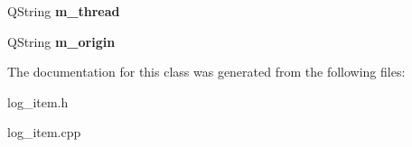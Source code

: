 \begin{DoxyCompactItemize}
\item 
\hypertarget{class_log__viewer_1_1_log__item_af97cbe89d09438bf284b5ba48f64a810}{Q\-String {\bfseries m\-\_\-thread}}\label{class_log__viewer_1_1_log__item_af97cbe89d09438bf284b5ba48f64a810}

\item 
\hypertarget{class_log__viewer_1_1_log__item_a3e27163b918b9ac0dac0ce30e2f12a0c}{Q\-String {\bfseries m\-\_\-origin}}\label{class_log__viewer_1_1_log__item_a3e27163b918b9ac0dac0ce30e2f12a0c}

\end{DoxyCompactItemize}


The documentation for this class was generated from the following files\-:\begin{DoxyCompactItemize}
\item 
log\-\_\-item.\-h\item 
log\-\_\-item.\-cpp\end{DoxyCompactItemize}
